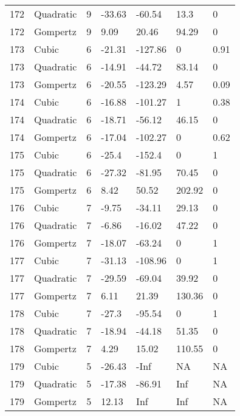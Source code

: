 \documentclass[11pt]{article}
\begin{document}
\begin{center}
\begin{longtable}{lllllll}
    172 & Quadratic & 9               & -33.63  & -60.54  & 13.3    & 0    \\
    172 & Gompertz  & 9               & 9.09    & 20.46   & 94.29   & 0    \\
    173 & Cubic     & 6               & -21.31  & -127.86 & 0       & 0.91 \\
    173 & Quadratic & 6               & -14.91  & -44.72  & 83.14   & 0    \\
    173 & Gompertz  & 6               & -20.55  & -123.29 & 4.57    & 0.09 \\
    174 & Cubic     & 6               & -16.88  & -101.27 & 1       & 0.38 \\
    174 & Quadratic & 6               & -18.71  & -56.12  & 46.15   & 0    \\
    174 & Gompertz  & 6               & -17.04  & -102.27 & 0       & 0.62 \\
    175 & Cubic     & 6               & -25.4   & -152.4  & 0       & 1    \\
    175 & Quadratic & 6               & -27.32  & -81.95  & 70.45   & 0    \\
    175 & Gompertz  & 6               & 8.42    & 50.52   & 202.92  & 0    \\
    176 & Cubic     & 7               & -9.75   & -34.11  & 29.13   & 0    \\
    176 & Quadratic & 7               & -6.86   & -16.02  & 47.22   & 0    \\
    176 & Gompertz  & 7               & -18.07  & -63.24  & 0       & 1    \\
    177 & Cubic     & 7               & -31.13  & -108.96 & 0       & 1    \\
    177 & Quadratic & 7               & -29.59  & -69.04  & 39.92   & 0    \\
    177 & Gompertz  & 7               & 6.11    & 21.39   & 130.36  & 0    \\
    178 & Cubic     & 7               & -27.3   & -95.54  & 0       & 1    \\
    178 & Quadratic & 7               & -18.94  & -44.18  & 51.35   & 0    \\
    178 & Gompertz  & 7               & 4.29    & 15.02   & 110.55  & 0    \\
    179 & Cubic     & 5               & -26.43  & -Inf    & NA      & NA   \\
    179 & Quadratic & 5               & -17.38  & -86.91  & Inf     & NA   \\
    179 & Gompertz  & 5               & 12.13   & Inf     & Inf     & NA   \\

\end{longtable}
\end{center}
\end{document}
